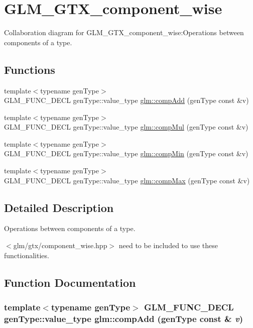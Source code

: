 \hypertarget{group__gtx__component__wise}{
\section{GLM\_\-GTX\_\-component\_\-wise}
\label{group__gtx__component__wise}
}


Collaboration diagram for GLM\_\-GTX\_\-component\_\-wise:Operations between components of a type.  
\subsection*{Functions}
\begin{CompactItemize}
\item 
{\footnotesize template$<$typename genType$>$ }\\GLM\_\-FUNC\_\-DECL genType::value\_\-type \hyperlink{group__gtx__component__wise_gce15ba5120a9295e90f3c0f16f3cbaf7}{glm::compAdd} (genType const \&v)
\item 
{\footnotesize template$<$typename genType$>$ }\\GLM\_\-FUNC\_\-DECL genType::value\_\-type \hyperlink{group__gtx__component__wise_gf6ecc951daaa8d0226bb6884919ae574}{glm::compMul} (genType const \&v)
\item 
{\footnotesize template$<$typename genType$>$ }\\GLM\_\-FUNC\_\-DECL genType::value\_\-type \hyperlink{group__gtx__component__wise_ge4f6961924637c6e9fcdcd93498d9151}{glm::compMin} (genType const \&v)
\item 
{\footnotesize template$<$typename genType$>$ }\\GLM\_\-FUNC\_\-DECL genType::value\_\-type \hyperlink{group__gtx__component__wise_gc32466f4e6405b6fdefc0fdfb5db77ec}{glm::compMax} (genType const \&v)
\end{CompactItemize}


\subsection{Detailed Description}
Operations between components of a type. 

$<$glm/gtx/component\_\-wise.hpp$>$ need to be included to use these functionalities. 

\subsection{Function Documentation}
\hypertarget{group__gtx__component__wise_gce15ba5120a9295e90f3c0f16f3cbaf7}{
\subsubsection[compAdd]{\setlength{\rightskip}{0pt plus 5cm}template$<$typename genType$>$ GLM\_\-FUNC\_\-DECL genType::value\_\-type glm::compAdd (genType const \& {\em v})}}
\label{group__gtx__component__wise_gce15ba5120a9295e90f3c0f16f3cbaf7}


